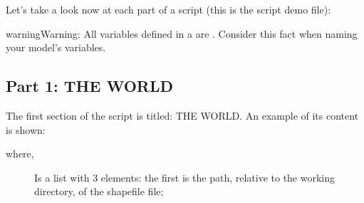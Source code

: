 \documentclass[letterpaper,10pt,english]{sphinxmanual}
\begin{document}
Let’s take a look now at each part of a script (this is the script   demo file):

\begin{sphinxadmonition}{warning}{Warning:}
All variables defined in a  are . Consider this fact when naming your model’s variables.
\end{sphinxadmonition}


\subsection{Part 1: THE WORLD}
\label{\detokenize{using:part-1-the-world}}
The first section of the script is titled: THE WORLD. An example of its content is shown:

\begin{sphinxVerbatim}[commandchars=\\\{\}]
  \PYG{p}{[}\PYG{p}{]}
  
  
 
\end{sphinxVerbatim}

where,
\begin{description}
\item[{}] \leavevmode
Is a list with 3 elements: the first is  the path, relative to the working directory, of the shapefile file;

\end{description}
\end{document}
